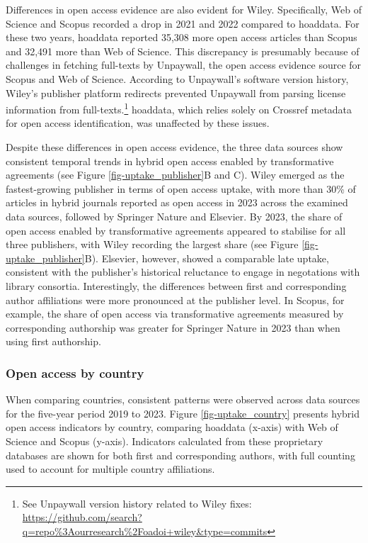 \documentclass[a4paper,man,floatsintext,longtable,noextraspace,10pt]{apa6}
\begin{document}
Differences in open access evidence are also evident for Wiley.
Specifically, Web of Science and Scopus recorded a drop in 2021 and 2022
compared to hoaddata. For these two years, hoaddata reported 35,308 more
open access articles than Scopus and 32,491 more than Web of Science.
This discrepancy is presumably because of challenges in fetching
full-texts by Unpaywall, the open access evidence source for Scopus and
Web of Science. According to Unpaywall's software version history,
Wiley's publisher platform redirects prevented Unpaywall from parsing
license information from full-texts.\footnote{See Unpaywall version
  history related to Wiley fixes:
  \url{https://github.com/search?q=repo\%3Aourresearch\%2Foadoi+wiley&type=commits}}
hoaddata, which relies solely on Crossref metadata for open access
identification, was unaffected by these issues.

Despite these differences in open access evidence, the three data
sources show consistent temporal trends in hybrid open access enabled by
transformative agreements (see Figure \ref{fig-uptake_publisher}B and
C). Wiley emerged as the fastest-growing publisher in terms of open
access uptake, with more than 30\% of articles in hybrid journals
reported as open access in 2023 across the examined data sources,
followed by Springer Nature and Elsevier. By 2023, the share of open
access enabled by transformative agreements appeared to stabilise for
all three publishers, with Wiley recording the largest share (see Figure
\ref{fig-uptake_publisher}B). Elsevier, however, showed a comparable
late uptake, consistent with the publisher's historical reluctance to
engage in negotations with library consortia. Interestingly, the
differences between first and corresponding author affiliations were
more pronounced at the publisher level. In Scopus, for example, the
share of open access via transformative agreements measured by
corresponding authorship was greater for Springer Nature in 2023 than
when using first authorship.

\subsubsection{Open access by country}\label{open-access-by-country}

When comparing countries, consistent patterns were observed across data
sources for the five-year period 2019 to 2023. Figure
\ref{fig-uptake_country} presents hybrid open access indicators by
country, comparing hoaddata (x-axis) with Web of Science and Scopus
(y-axis). Indicators calculated from these proprietary databases are
shown for both first and corresponding authors, with full counting used
to account for multiple country affiliations.
\end{document}
